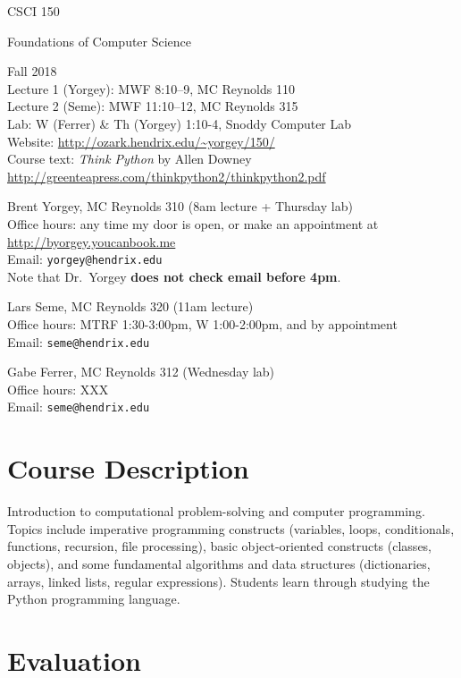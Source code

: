 \documentclass{article}
\begin{document}
{\Large
\noindent CSCI 150 \smallskip

\noindent Foundations of Computer Science \bigskip
}

\noindent Fall 2018 \\
Lecture 1 (Yorgey): MWF 8:10--9, MC Reynolds 110\\
Lecture 2 (Seme): MWF 11:10--12, MC Reynolds 315\\
Lab: W (Ferrer) \& Th (Yorgey) 1:10-4, Snoddy Computer Lab\\
Website: \url{http://ozark.hendrix.edu/~yorgey/150/} \\
Course text: \emph{Think Python} by Allen Downey \\
\indent \url{http://greenteapress.com/thinkpython2/thinkpython2.pdf}
\medskip

\noindent Brent Yorgey, MC Reynolds 310 (8am lecture + Thursday lab)\\
Office hours: any time my door is open, or make an appointment at \\
\indent \url{http://byorgey.youcanbook.me} \\
Email: \texttt{yorgey@hendrix.edu} \\
Note that Dr.\ Yorgey \textbf{does not check email before 4pm}.\medskip

\noindent Lars Seme, MC Reynolds 320 (11am lecture)\\
Office hours: MTRF 1:30-3:00pm, W 1:00-2:00pm, and by appointment \\
Email: \texttt{seme@hendrix.edu}

\noindent Gabe Ferrer, MC Reynolds 312 (Wednesday lab)\\
Office hours: XXX \\
Email: \texttt{seme@hendrix.edu}


\section*{Course Description}

Introduction to computational problem-solving and computer
programming. Topics include imperative programming constructs
(variables, loops, conditionals, functions, recursion, file
processing), basic object-oriented constructs (classes, objects), and
some fundamental algorithms and data structures (dictionaries, arrays,
linked lists, regular expressions). Students learn through studying
the Python programming language.

\section*{Evaluation}
\end{document}
